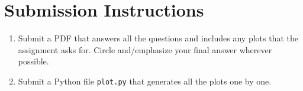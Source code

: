\documentclass{homework}
\begin{document}

\section*{Submission Instructions}

\begin{enumerate}
  \item Submit a PDF that answers all the questions and includes any plots that the assignment asks for. Circle and/emphasize your final answer wherever possible.
  \item Submit a Python file \eg \texttt{plot.py} that generates all the plots one by one.
\end{enumerate}
\end{document}
